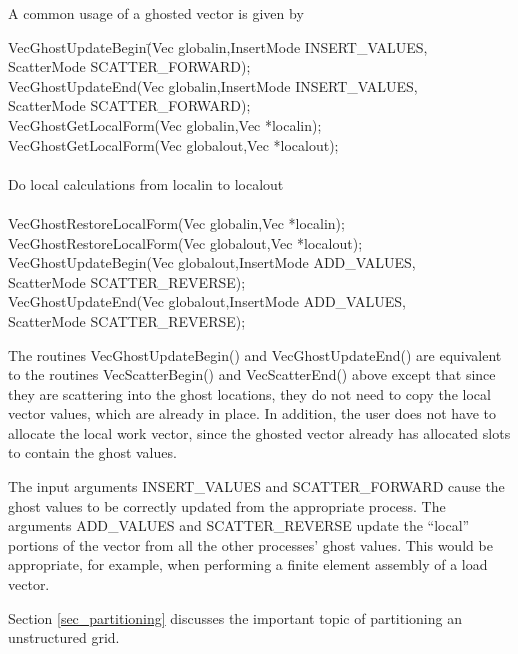 A common usage of a ghosted vector is given by
\begin{tabbing}
  VecGhostUpdateBegin\=(Vec globalin,InsertMode INSERT\_VALUES,\\
                      \>             ScatterMode SCATTER\_FORWARD);\\
  VecGhostUpdateEnd(Vec globalin,InsertMode INSERT\_VALUES,\\
                      \>           ScatterMode SCATTER\_FORWARD);\\
  VecGhostGetLocalForm(Vec globalin,Vec *localin);\\
  VecGhostGetLocalForm(Vec globalout,Vec *localout);\\
   \trl{/*}\\
      Do local calculations from localin to localout \\
   \trl{*/}\\
  VecGhostRestoreLocalForm(Vec globalin,Vec *localin);\\
  VecGhostRestoreLocalForm(Vec globalout,Vec *localout);\\
  VecGhostUpdateBegin(Vec globalout,InsertMode ADD\_VALUES,\\
                        \>            ScatterMode SCATTER\_REVERSE);\\
  VecGhostUpdateEnd(Vec globalout,InsertMode ADD\_VALUES,\\
                        \>          ScatterMode SCATTER\_REVERSE);
\end{tabbing}

The routines VecGhostUpdateBegin() and VecGhostUpdateEnd() are equivalent to the routines VecScatterBegin() and VecScatterEnd()
above except that since they are scattering into the ghost locations, they do not need
to copy the local vector values, which are already in place. In addition, the user does not
have to allocate the local work vector, since the ghosted vector already has allocated
slots to contain the ghost values.

The input arguments INSERT\_VALUES and SCATTER\_FORWARD
cause the ghost values to be correctly updated from the appropriate
process. The arguments ADD\_VALUES and SCATTER\_REVERSE
update the ``local'' portions of the vector from all the other
processes' ghost values.  This would be appropriate, for example,
when performing a finite element assembly of a load vector.

Section \ref{sec_partitioning} discusses the important topic of partitioning
an unstructured grid.


